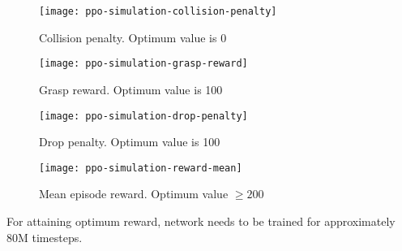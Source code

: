\begin{figure}[H]
	\centering
	\texttt{[image: ppo-simulation-collision-penalty]}
	\caption{Collision penalty. Optimum value is 0}
\end{figure}

\begin{figure}[H]
	\centering
	\texttt{[image: ppo-simulation-grasp-reward]}
	\caption{Grasp reward. Optimum value is 100}
\end{figure}

\begin{figure}[H]
	\centering
	\texttt{[image: ppo-simulation-drop-penalty]}
	\caption{Drop penalty. Optimum value is 100}
\end{figure}

\begin{figure}[H]
	\centering
	\texttt{[image: ppo-simulation-reward-mean]}
	\caption{Mean episode reward. Optimum value $\ge 200$}
\end{figure}

For attaining optimum reward, network needs to be trained for approximately 80M timesteps.